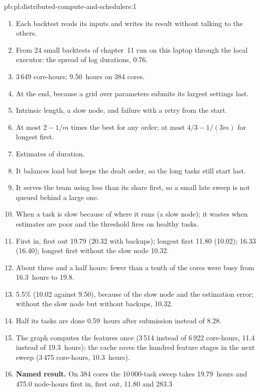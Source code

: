 \begin{solution}{pb:pl:distributed-compute-and-schedulers:1}
\begin{enumerate}
\item Each backtest reads its inputs and writes its result without talking to the others.
\item From 24 small backtests of chapter~11 run on this laptop through the local executor: the spread of log durations, 0.76.
\item 3\,649 core-hours; 9.50~hours on 384 cores.
\item At the end, because a grid over parameters submits its largest settings last.
\item Intrinsic length, a slow node, and failure with a retry from the start.
\item At most $2 - 1/m$ times the best  for any order; at most $4/3 - 1/(3m)$ for longest first.
\item Estimates of duration.
\item It balances load but keeps the dealt order, so the long tasks still start last.
\item It serves the team using less than its share first, so a small late sweep is not queued behind a large one.
\item When a task is slow because of where it runs (a slow node); it wastes when estimates are poor and the threshold fires on healthy tasks.
\item First in, first out 19.79 (20.32 with backups); longest first 11.80 (10.02);  16.33 (16.40); longest first without the slow
node 10.32.
\item About three and a half hours: fewer than a tenth of the cores were busy from 16.3~hours to 19.8.
\item 5.5\% (10.02 against 9.50), because of the slow node and the estimation error; without the slow node but without backups, 10.32.
\item Half its tasks are done 0.59~hours after submission instead of 8.28.
\item The graph computes the features once (3\,514 instead of 6\,922 core-hours, 11.4 instead of 19.3~hours); the cache saves the hundred
feature stages in the next sweep (3\,475 core-hours, 10.3~hours).
\item \textbf{Named result.} On 384 cores the 10\,000-task sweep takes 19.79~hours and 475.0 node-hours first in, first out, 11.80 and 283.3

\end{enumerate}
\end{solution}
